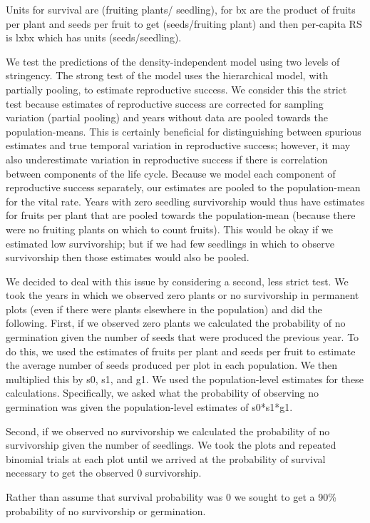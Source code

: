 \documentclass[12pt, oneside, titlepage]{article}   	%
\begin{document}
Units for survival are (fruiting plants/ seedling), for bx are the product of fruits per plant and seeds per fruit to get (seeds/fruiting plant) and then per-capita RS is lxbx which has units (seeds/seedling).

We test the predictions of the density-independent model using two levels of stringency. The strong test of the model uses the hierarchical model, with partially pooling, to estimate reproductive success. We consider this the strict test because estimates of reproductive success are corrected for sampling variation (partial pooling) and years without data are pooled towards the population-means. This is certainly beneficial for distinguishing between spurious estimates and true temporal variation in reproductive success; however, it may also underestimate variation in reproductive success if there is correlation between components of the life cycle. Because we model each component of reproductive success separately, our estimates are pooled to the population-mean for the vital rate. Years with zero seedling survivorship would thus have estimates for fruits per plant that are pooled towards the population-mean (because there were no fruiting plants on which to count fruits). This would be okay if we estimated low survivorship; but if we had few seedlings in which to observe survivorship then those estimates would also be pooled. 


We decided to deal with this issue by considering a second, less strict test. We took the years in which we observed zero plants or no survivorship in permanent plots (even if there were plants elsewhere in the population) and did the following. First, if we observed zero plants we calculated the probability of no germination given the number of seeds that were produced the previous year. To do this, we used the estimates of fruits per plant and seeds per fruit to estimate the average number of seeds produced per plot in each population. We then multiplied this by s0, s1, and g1. We used the population-level estimates for these calculations. Specifically, we asked what the probability of observing no germination was given the population-level estimates of s0*s1*g1.

Second, if we observed no survivorship we calculated the probability of no survivorship given the number of seedlings. We took the plots and repeated binomial trials at each plot until we arrived at the probability of survival necessary to get the observed 0 survivorship. 

Rather than assume that survival probability was 0 we sought to get a 90\% probability of no survivorship or germination. 

\clearpage
\newpage




\clearpage
 

\end{document}
